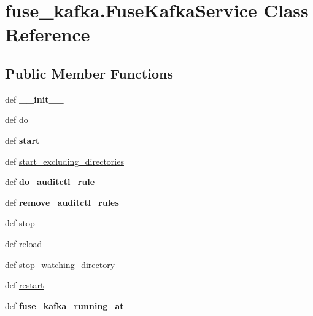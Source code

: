 \hypertarget{classfuse__kafka_1_1FuseKafkaService}{\section{fuse\-\_\-kafka.\-Fuse\-Kafka\-Service \-Class \-Reference}
\label{classfuse__kafka_1_1FuseKafkaService}
}
\subsection*{\-Public \-Member \-Functions}
\begin{DoxyCompactItemize}
\item 
\hypertarget{classfuse__kafka_1_1FuseKafkaService_a0bd77704cc258a800441426e62452195}{def {\bfseries \-\_\-\-\_\-init\-\_\-\-\_\-}}\label{classfuse__kafka_1_1FuseKafkaService_a0bd77704cc258a800441426e62452195}

\item 
def \hyperlink{classfuse__kafka_1_1FuseKafkaService_a08ccfab12ff2c998f5bc466de9c9afa4}{do}
\item 
\hypertarget{classfuse__kafka_1_1FuseKafkaService_a2d8e0d317d293fa8f932e3e8882549f5}{def {\bfseries start}}\label{classfuse__kafka_1_1FuseKafkaService_a2d8e0d317d293fa8f932e3e8882549f5}

\item 
def \hyperlink{classfuse__kafka_1_1FuseKafkaService_a8a8b5dd68c2c1dbd9315ac2ea4bd5219}{start\-\_\-excluding\-\_\-directories}
\item 
\hypertarget{classfuse__kafka_1_1FuseKafkaService_ade0772797e10e102f09fb39d94ae55ba}{def {\bfseries do\-\_\-auditctl\-\_\-rule}}\label{classfuse__kafka_1_1FuseKafkaService_ade0772797e10e102f09fb39d94ae55ba}

\item 
\hypertarget{classfuse__kafka_1_1FuseKafkaService_ac06b8bbc4db4a1179902e1ceab45eeef}{def {\bfseries remove\-\_\-auditctl\-\_\-rules}}\label{classfuse__kafka_1_1FuseKafkaService_ac06b8bbc4db4a1179902e1ceab45eeef}

\item 
def \hyperlink{classfuse__kafka_1_1FuseKafkaService_ad17bb7d3209b7242defee5aa54ca828e}{stop}
\item 
def \hyperlink{classfuse__kafka_1_1FuseKafkaService_a1f122fd8f929a5d8e56d8d1bad9cc465}{reload}
\item 
def \hyperlink{classfuse__kafka_1_1FuseKafkaService_a6ea1d1193be9c118752f6b7a4c53df92}{stop\-\_\-watching\-\_\-directory}
\item 
def \hyperlink{classfuse__kafka_1_1FuseKafkaService_a7cc4774d8ed31ffe42ca2f955501ee45}{restart}
\item 
\hypertarget{classfuse__kafka_1_1FuseKafkaService_a98ff58e8695372bd375fe9d2ca30668d}{def {\bfseries fuse\-\_\-kafka\-\_\-running\-\_\-at}}\label{classfuse__kafka_1_1FuseKafkaService_a98ff58e8695372bd375fe9d2ca30668d}


\end{DoxyCompactItemize}
